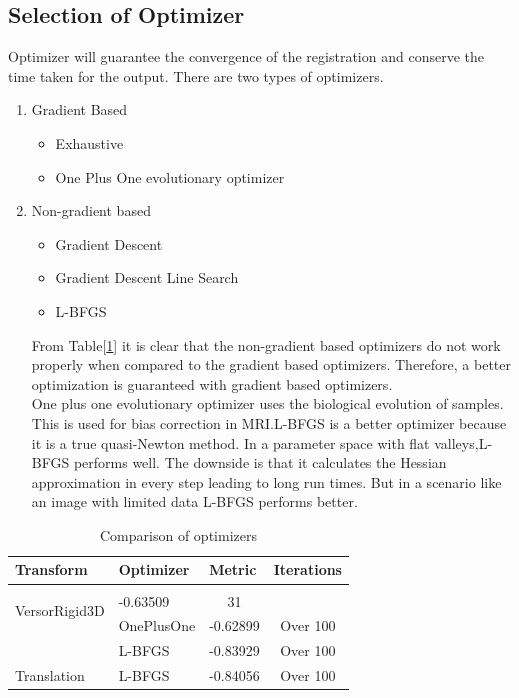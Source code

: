 \documentclass[11pt,english]{article}
\begin{document}
\subsection*{Selection of Optimizer}
Optimizer will guarantee the convergence of the registration and conserve the time taken for the output. There are two types of optimizers. 
\begin{enumerate}
    \item Gradient Based 
    \begin{itemize}
        \item Exhaustive 
        \item One Plus One evolutionary optimizer  
    \end{itemize}
    \item Non-gradient based 
    \begin{itemize}
        \item Gradient Descent  
        \item Gradient Descent Line Search  
        \item \gls{L-BFGS}
    \end{itemize}
From Table[\ref{tab:optimizers}] it is clear that the non-gradient based optimizers do not work properly when compared to the gradient based optimizers. Therefore, a better optimization is guaranteed with gradient based optimizers.\\  
One plus one evolutionary optimizer uses the biological evolution of samples. This is used for bias correction in \gls{MRI}\cite{itkmanual2}.\gls{L-BFGS} is a better optimizer because it is a true quasi-Newton method. In a parameter space with flat valleys,\gls{L-BFGS} performs well. The downside is that it calculates the Hessian approximation in every step leading to long run times. But in a scenario like an image with limited data \gls{L-BFGS} performs better\cite{LBFGS}.
\end{enumerate}
\begin{longtable}[c]{|l|l|c|c|}
    \caption{Comparison of optimizers}
    \label{tab:optimizers}\\
    \hline
    \textbf{Transform} &
      \textbf{Optimizer} &
      \multicolumn{1}{l|}{\textbf{Metric}} &
      \multicolumn{1}{l|}{\textbf{Iterations}} \\ \hline
    \endfirsthead
    \endhead
    \multirow{3}{*}{VersorRigid3D} &
      \begin{tabular}[c]{@{}l@{}}GradientDescent\\ Line Search\end{tabular} &
      -0.63509 &
      31 \\ \cline{2-4} 
                & OnePlusOne  & -0.62899 & Over 100 \\ \cline{2-4} 
                & \gls{L-BFGS} & -0.83929 & Over 100 \\ \hline
    Translation & \gls{L-BFGS} & -0.84056 & Over 100 \\ \hline
\end{longtable}
\end{document}
